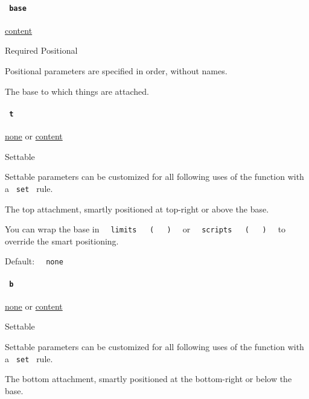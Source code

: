 \paragraph{\texorpdfstring{\texttt{\ base\ }}{ base }}\label{functions-attach-base}

\href{/docs/reference/foundations/content/}{content}

{Required} {{ Positional }}

\label{functions-attach-base-positional-tooltip}
Positional parameters are specified in order, without names.

The base to which things are attached.

\paragraph{\texorpdfstring{\texttt{\ t\ }}{ t }}\label{functions-attach-t}

\href{/docs/reference/foundations/none/}{none} {or}
\href{/docs/reference/foundations/content/}{content}

{{ Settable }}

\label{functions-attach-t-settable-tooltip}
Settable parameters can be customized for all following uses of the
function with a \texttt{\ set\ } rule.

The top attachment, smartly positioned at top-right or above the base.

You can wrap the base in
\texttt{\ }{\texttt{\ limits\ }}\texttt{\ }{\texttt{\ (\ }}\texttt{\ }{\texttt{\ )\ }}\texttt{\ }
or
\texttt{\ }{\texttt{\ scripts\ }}\texttt{\ }{\texttt{\ (\ }}\texttt{\ }{\texttt{\ )\ }}\texttt{\ }
to override the smart positioning.

Default: \texttt{\ }{\texttt{\ none\ }}\texttt{\ }

\paragraph{\texorpdfstring{\texttt{\ b\ }}{ b }}\label{functions-attach-b}

\href{/docs/reference/foundations/none/}{none} {or}
\href{/docs/reference/foundations/content/}{content}

{{ Settable }}

\label{functions-attach-b-settable-tooltip}
Settable parameters can be customized for all following uses of the
function with a \texttt{\ set\ } rule.

The bottom attachment, smartly positioned at the bottom-right or below
the base.

